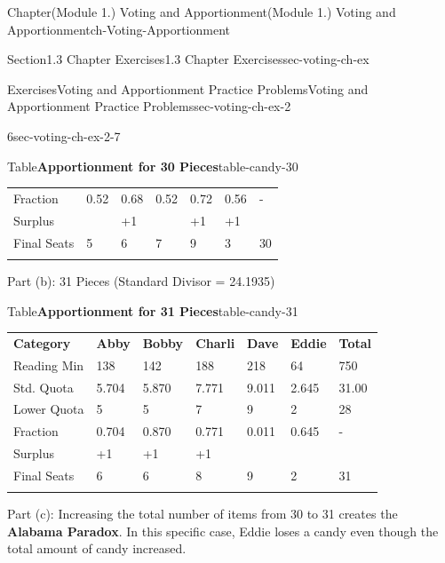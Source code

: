 \documentclass[oneside,10pt,]{book}
\newcommand{\tabularfont}{\relax}
\newcommand{\terminology}[1]{\textbf{#1}}
\newcommand{\hrulethin}  {\noalign{\hrule height 0.04em}}
\begin{document}
\begin{chapterptx}{Chapter}{(Module 1.) Voting and Apportionment}{}{(Module 1.) Voting and Apportionment}{}{}{ch-Voting-Apportionment}
\begin{sectionptx}{Section}{1.3 Chapter Exercises}{}{1.3 Chapter Exercises}{}{}{sec-voting-ch-ex}
\begin{exercises-subsection-numberless}{Exercises}{Voting and Apportionment Practice Problems}{}{Voting and Apportionment Practice Problems}{}{}{sec-voting-ch-ex-2}
\begin{divisionexercise}{6}{}{}{sec-voting-ch-ex-2-7}
\begin{tableptx}{Table}{\textbf{Apportionment for 30 Pieces}}{table-candy-30}{}
{\begin{tabular}{lllllll}
Fraction&0.52&0.68&0.52&0.72&0.56&-\tabularnewline\hrulethin
Surplus&&+1&&+1&+1&\tabularnewline\hrulethin
Final Seats&5&6&7&9&3&30\tabularnewline\hrulethin
\end{tabular}
}%
\end{tableptx}%
Part (b): 31 Pieces (Standard Divisor = 24.1935)%
\begin{tableptx}{Table}{\textbf{Apportionment for 31 Pieces}}{table-candy-31}{}%
\centering%
{\tabularfont%
\begin{tabular}{lllllll}\hrulethin
{\bfseries{}Category}&{\bfseries{}Abby}&{\bfseries{}Bobby}&{\bfseries{}Charli}&{\bfseries{}Dave}&{\bfseries{}Eddie}&{\bfseries{}Total}\tabularnewline\hrulethin
Reading Min&138&142&188&218&64&750\tabularnewline\hrulethin
Std. Quota&5.704&5.870&7.771&9.011&2.645&31.00\tabularnewline\hrulethin
Lower Quota&5&5&7&9&2&28\tabularnewline\hrulethin
Fraction&0.704&0.870&0.771&0.011&0.645&-\tabularnewline\hrulethin
Surplus&+1&+1&+1&&&\tabularnewline\hrulethin
Final Seats&6&6&8&9&2&31\tabularnewline\hrulethin
\end{tabular}
}%
\end{tableptx}%
Part (c): Increasing the total number of items from 30 to 31 creates the \terminology{Alabama Paradox}. In this specific case, Eddie loses a candy even though the total amount of candy increased.%
\end{divisionexercise}%
\end{exercises-subsection-numberless}
\end{sectionptx}
\end{chapterptx}
%
%
\typeout{************************************************}
\typeout{************************************************}
%
\end{document}
